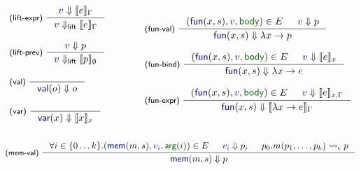 \documentclass[english,submission]{programming}
\theoremstyle{plain}
\theoremstyle{definition}
\newcommand{\ident}[1]{\textnormal{\textcolor{idclr}{\sffamily #1}}}
\newcommand{\bndclr}[1]{\textcolor{kvdclr}{#1}}
\newcommand{\bnd}[1]{\textnormal{\textcolor{kvdclr}{\sffamily #1}}}
\newcommand{\blbl}[1]{\textnormal{\textcolor{numclr}{\sffamily #1}}}
\newcommand{\rname}[1]{{\sffamily(#1)}}
\begin{document}
\begin{figure}
\begin{equation*}
\vspace{-2.5em}
\hspace{-0.5em}
\begin{array}{l}
\inference[\rname{lift-expr}~]
  {\bndclr{v} \Downarrow \llbracket e \rrbracket_\Gamma}
  {\bndclr{v} \Downarrow_{\ident{lift}} \llbracket e \rrbracket_\Gamma}
\\
\\
\inference[\rname{lift-prev}~]
  {\bndclr{v} \Downarrow p}
  {\bndclr{v} \Downarrow_{\ident{lift}} \llbracket p \rrbracket_\emptyset}
\\
\\
\inference[\rname{val}~]
  {~}
  {\bnd{val}(o) \Downarrow o }
\\
\\
\inference[\rname{var}~]
  {~}
  {\bnd{var}(x) \Downarrow \llbracket x \rrbracket_x}
  \\[0.5em]~
\end{array}
\qquad\quad
\begin{array}{l}
\inference[\rname{fun-val}~]
  { (\bnd{fun}(x, s), \bndclr{v}, \blbl{body}) \in E & \bndclr{v} \Downarrow p }
  { \bnd{fun}(x, s) \Downarrow \lambda x\rightarrow p }
\\
\\
\inference[\rname{fun-bind}~]
  { (\bnd{fun}(x, s), \bndclr{v}, \blbl{body}) \in E & \bndclr{v} \Downarrow \llbracket e \rrbracket_{x} }
  { \bnd{fun}(x, s) \Downarrow \lambda x\rightarrow e }
\\
\\
\inference[\rname{fun-expr}~]
  { (\bnd{fun}(x, s), \bndclr{v}, \blbl{body}) \in E & \bndclr{v} \Downarrow \llbracket e \rrbracket_{x,\Gamma} }
  { \bnd{fun}(x, s) \Downarrow \llbracket \lambda x\rightarrow e \rrbracket_\Gamma }
\\[0.5em]~
\end{array}
\end{equation*}
\vspace{-0.5em}
\begin{equation*}
\hspace{-1em}
\begin{array}{l}
\inference[\rname{mem-val}~]
  { \forall i\in\{0\ldots k\}.(\bnd{mem}(m, s), \bndclr{v_i}, \blbl{arg}(i)) \in E & \bndclr{v_i} \Downarrow p_i
    & p_0.m(p_1, \ldots, p_k) \rightsquigarrow_\epsilon p }
  { \bnd{mem}(m, s) \Downarrow p }
\\
\\

\end{array}
\end{equation*}
\end{figure}
\end{document}

